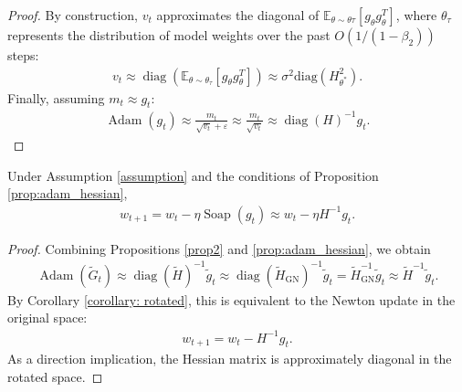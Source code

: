 \begin{proof}
By construction, $v_t$ approximates the diagonal of $\mathbb{E}_{\theta \sim \theta\tau}[g_\theta g_\theta^T]$, where $\theta_\tau$ represents the distribution of model weights over the past $O(1/(1-\beta_2))$ steps:
\begin{align*}
    v_t \approx \operatorname{diag}\left(\mathbb{E}_{\theta \sim \theta_\tau}  \left[ g_\theta g_\theta^T \right] \right) \approx \sigma^2  \text{diag}(   H_{\theta^*}^2).
\end{align*}
Finally, assuming $m_t \approx g_t$:
\begin{align*}
    \operatorname{Adam}\left(g_t\right) \approx \frac{m_t}{\sqrt{v_t}+\varepsilon} \approx \frac{m_t}{\sqrt{v_t}}
    \approx \operatorname{diag}(H)^{-1} g_t.
\end{align*}
\end{proof}

\begin{theorem} Under Assumption \ref{assumption} and the conditions of Proposition \ref{prop:adam_hessian}, 
\begin{align}
    w_{t+1} = w_{t} - \eta \operatorname{Soap}(g_t) \approx w_t - \eta H^{-1} g_t.
\end{align}
\end{theorem}
\begin{proof}
    Combining Propositions \ref{prop2} and \ref{prop:adam_hessian}, we obtain
\begin{align}
\operatorname{Adam}(\widetilde{G}_t) \approx \operatorname{diag}(\widetilde{H})^{-1} \widetilde{g}_t \approx \operatorname{diag}(\widetilde{H}_{\text{GN}})^{-1} \widetilde{g}_t = \widetilde{H}_{\text{GN}}^{-1} \widetilde{g}_t \approx \widetilde{H}^{-1} \widetilde{g}_t.
\end{align}
By  Corollary \ref{corollary: rotated}, this is equivalent to  the Newton update in the original space:
\begin{align}
w_{t+1} = w_t - H^{-1}g_t.
\end{align}
As a direction implication, the Hessian matrix is approximately diagonal in the rotated space.
\end{proof} 

